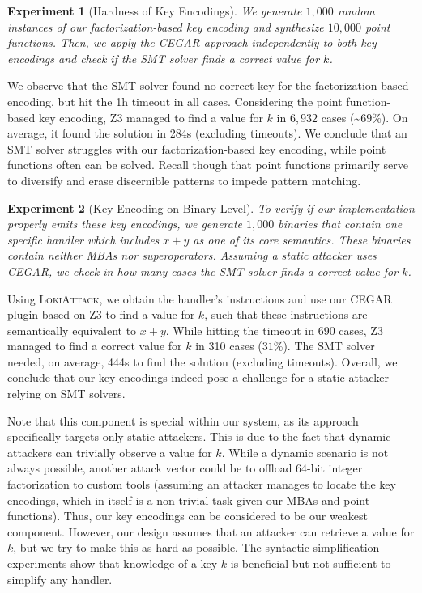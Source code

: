 \documentclass[letterpaper,twocolumn,10pt]{article}
\theoremstyle{customexample}
\theoremstyle{customexperiment}
\newtheorem{experiment}{Experiment}
\newcommand{\lokiattack}{\textsc{LokiAttack}\xspace}
\newcommand{\zt}{\textsc{Z3}\xspace}
\begin{document}
\begin{experiment}[Hardness of Key Encodings]\label{experiment:smt:key_encodings}
We generate $1,000$ random instances of our factorization-based key encoding and synthesize $10,000$ point functions. Then, we apply the CEGAR approach independently to both key encodings and check if the SMT solver finds a correct value for $k$.
\end{experiment}

We observe that the SMT solver found no correct key for the factorization-based encoding, but hit the 1h timeout in all cases. Considering the point function-based key encoding, \zt managed to find a value for $k$ in $6,932$ cases (\textasciitilde$69$\%). On average, it found the solution in 284s (excluding timeouts).
We conclude that an SMT solver struggles with our factorization-based key encoding, while point functions often can be solved. Recall though that point functions primarily serve to diversify and erase discernible patterns to impede pattern matching. 

\begin{experiment}[Key Encoding on Binary Level]\label{experiment:smt:low_level}
To verify if our implementation properly emits these key encodings, we generate $1,000$ binaries that contain one specific handler which includes $x + y$ as one of its core semantics. These binaries contain neither MBAs nor superoperators. 
Assuming a static attacker uses CEGAR, we check in how many cases 
the SMT solver finds a correct value for $k$.
\end{experiment}

Using \lokiattack, we obtain the handler's instructions and use our CEGAR plugin based on \zt to find a value for $k$, such that these instructions are semantically equivalent to $x + y$. While hitting the timeout in 690 cases, \zt managed to find a correct value for $k$ in 310 cases ($31$\%). The SMT solver needed, on average, 444s to find the solution (excluding timeouts).
Overall, we conclude that our key encodings indeed pose a challenge for a static attacker relying on SMT solvers. 

Note that this component is special within our system, as its approach specifically targets only static attackers. This is due to the fact that dynamic attackers can trivially observe a value for $k$. While a dynamic scenario is not always possible, another attack vector could be to offload 64-bit integer factorization to custom tools (assuming an attacker manages to locate the key encodings, which in itself is a non-trivial task given our MBAs and point functions). Thus, our key encodings can be considered to be our weakest component. However, our design assumes that an attacker can retrieve a value for $k$, but we try to make this as hard as possible. The syntactic simplification experiments show that knowledge of a key $k$ is beneficial but not sufficient to simplify any handler.
\end{document}
